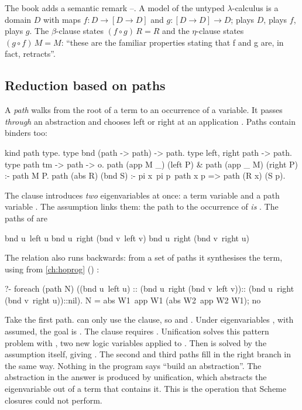 {{The book adds a semantic remark --. A model of the untyped $\lambda$-calculus is a domain
$D$ with maps $f:D\to[D\to D]$ and $g:[D\to D]\to D$;  plays $D$,  plays $f$,  plays
$g$. The $\beta$-clause states $(f\circ g)\,R=R$ and the $\eta$-clause states $(g\circ f)\,M=M$: \enquote{these
are the familiar properties stating that f and g are, in fact, retracts}.

\subsection{Reduction based on paths}\label{sec:lambdatree-paths}

A \emph{path} walks from the root of a term to an occurrence of a variable. It passes \emph{through} an
abstraction and chooses left or right at an application . Paths contain binders too:
\begin{lprolog}
kind path type.
type bnd          (path -> path) -> path.
type left, right  path -> path.
type path         tm -> path -> o.
path (app M _) (left P) &
path (app _ M) (right P) :- path M P.
path (abs R) (bnd S) :- pi x\ pi p\ path x p => path (R x) (S p).
\end{lprolog}
The  clause introduces \emph{two} eigenvariables at once: a term variable  and a path variable
. The assumption  links them: the path to the occurrence of  \emph{is} . The paths of
 are 
\begin{lprolog}
bnd u\ left u
bnd u\ right (bnd v\ left v)
bnd u\ right (bnd v\ right u)
\end{lprolog}
The relation also runs backwards: from a set of paths it synthesises the term, using  from
\cref{ch:hoprog} () :
\begin{lprolog}
?- foreach (path N)
     ((bnd u\ left u) ::
      (bnd u\ right (bnd v\ left v))::
      (bnd u\ right (bnd v\ right u))::nil).
N = abs W1\ app W1 (abs W2\ app W2 W1);
no
\end{lprolog}

\begin{tutorial}
Take the first path.  can only use the  clause, so  and
. Under eigenvariables ,  with  assumed, the goal is
. The  clause requires . Unification solves this pattern
problem with , two new logic variables applied to . Then 
is solved by the assumption  itself, giving . The second and third paths fill in
the right branch in the same way. Nothing in the program says \enquote{build an abstraction}. The abstraction
in the answer is produced by unification, which abstracts the eigenvariable  out of a term that contains
it. This is the operation that Scheme closures could not perform.
\end{tutorial}

}}
